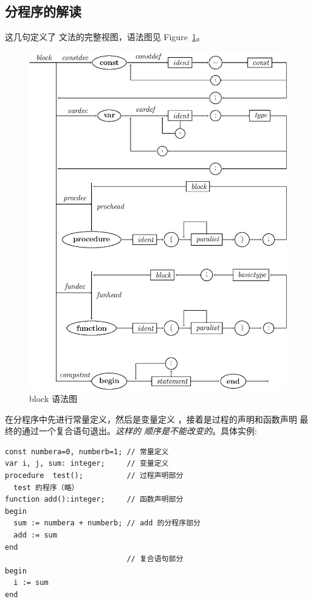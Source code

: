 \subsection{分程序的解读}










这几句定义了  文法的完整视图，语法图见 Figure~\ref{block}。
\begin{figure}[!h]
\begin{center}
    \includegraphics[scale=.8]{Figures/block.eps}
\end{center}
\caption{block 语法图}
\label{block}
\end{figure}
在分程序中先进行常量定义，然后是变量定义
 ，接着是过程的声明和函数声明
最终的通过一个复合语句退出。\emph{这样的
顺序是不能改变的}。具体实例:
\begin{verbatim}
const numbera=0, numberb=1; // 常量定义
var i, j, sum: integer;     // 变量定义
procedure  test();          // 过程声明部分
  test 的程序（略）
function add():integer;     // 函数声明部分
begin
  sum := numbera + numberb; // add 的分程序部分
  add := sum
end
                            // 复合语句部分
begin
  i := sum
end
\end{verbatim}
